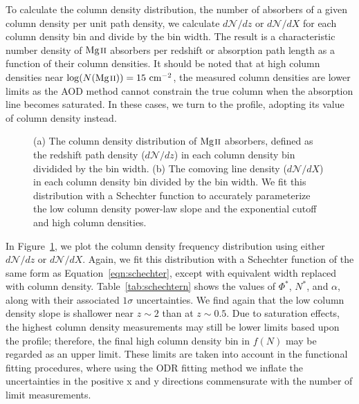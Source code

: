 \documentclass[iop,apj,numberedappendix,appendixfloats,twocolappendix]{emulateapj}
\begin{document}
To calculate the column density distribution, the number of absorbers of a given column density per unit path density, we calculate $d\mathcal{N}\!/dz$ or $d\mathcal{N}\!/dX$ for each column density bin and divide by the bin width. The result is a characteristic number density of ${\hbox{{\rm Mg}\kern 0.1em{\sc ii}}}$ absorbers per redshift or absorption path length as a function of their column densities. It should be noted that at high column densities near $\log (N({\hbox{{\rm Mg}\kern 0.1em{\sc ii}}})) = 15~\mathrm{cm^{-2}}$, the measured column densities are lower limits as the AOD method cannot constrain the true column when the absorption line becomes saturated. In these cases, we turn to the {\MgIIsecond} profile, adopting its value of column density instead.

\begin{figure*}[bth]
\caption{(a) The column density distribution of ${\hbox{{\rm Mg}\kern 0.1em{\sc ii}}}$ absorbers, defined as the redshift path density ($d\mathcal{N}\!/dz$) in each column density bin dividided by the bin width. (b) The comoving line density ($d\mathcal{N}\!/dX$) in each column density bin divided by the bin width. We fit this distribution with a Schechter function to accurately parameterize the low column density power-law slope and the exponential cutoff and high column densities.}
\label{fig:logndistro}
\end{figure*}

In Figure~\ref{fig:logndistro}, we plot the column density frequency distribution using either $d\mathcal{N}\!/dz$ or $d\mathcal{N}\!/dX$. Again, we fit this distribution with a Schechter function of the same form as Equation~\ref{eqn:schechter}, except with equivalent width replaced with column density. Table~\ref{tab:schechtern} shows the values of $\Phi^*$, $N^*$, and $\alpha$, along with their associated $1\sigma$ uncertainties. We find again that the low column density slope is shallower near $z \sim 2$ than at $z \sim 0.5$. Due to saturation effects, the highest column density measurements may still be lower limits based upon the {\MgIIsecond} profile; therefore, the final high column density bin in $f(N)$ may be regarded as an upper limit. These limits are taken into account in the functional fitting procedures, where using the ODR fitting method we inflate the uncertainties in the positive x and y directions commensurate with the number of limit measurements.
\end{document}
